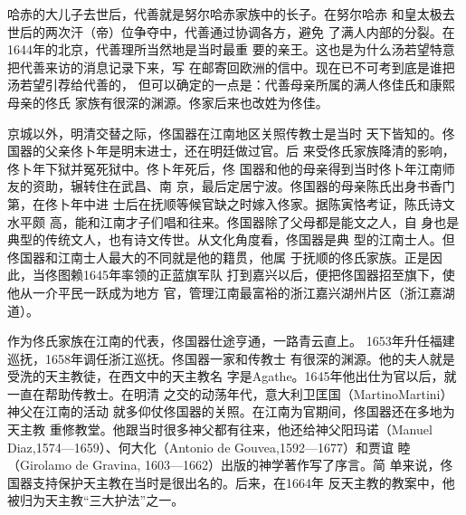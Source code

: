 哈赤的大儿子去世后，代善就是努尔哈赤家族中的长子。在努尔哈赤%
和皇太极去世后的两次汗（帝）位争夺中，代善通过协调各方，避免%
了满人内部的分裂。在1644年的北京，代善理所当然地是当时最重%
要的亲王。这也是为什么汤若望特意把代善来访的消息记录下来，写%
在邮寄回欧洲的信中。现在已不可考到底是谁把汤若望引荐给代善的，%
但可以确定的一点是：代善母亲所属的满人佟佳氏和康熙母亲的佟氏%
家族有很深的渊源。佟家后来也改姓为佟佳。%
\par
京城以外，明清交替之际，佟国器在江南地区关照传教士是当时%
天下皆知的。佟国器的父亲佟卜年是明末进士，还在明廷做过官。后%
来受佟氏家族降清的影响，佟卜年下狱并冤死狱中。佟卜年死后，佟%
国器和他的母亲得到当时佟卜年江南师友的资助，辗转住在武昌、南%
京，最后定居宁波。佟国器的母亲陈氏出身书香门第，在佟卜年中进%
士后在抚顺等候官缺之时嫁入佟家。据陈寅恪考证，陈氏诗文水平颇%
高，能和江南才子们唱和往来。佟国器除了父母都是能文之人，自%
身也是典型的传统文人，也有诗文传世。从文化角度看，佟国器是典%
型的江南士人。但佟国器和江南士人最大的不同就是他的籍贯，他属%
于抚顺的佟氏家族。正是因此，当佟图赖1645年率领的正蓝旗军队%
打到嘉兴以后，便把佟国器招至旗下，使他从一介平民一跃成为地方%
官，管理江南最富裕的浙江嘉兴湖州片区（浙江嘉湖道）。%
\par
作为佟氏家族在江南的代表，佟国器仕途亨通，一路青云直上。%
1653年升任福建巡抚，1658年调任浙江巡抚。佟国器一家和传教士%
有很深的渊源。他的夫人就是受洗的天主教徒，在西文中的天主教名%
字是Agathe。1645年他出仕为官以后，就一直在帮助传教士。在明清%
之交的动荡年代，意大利卫匡国（MartinoMartini）神父在江南的活动%
就多仰仗佟国器的关照。在江南为官期间，佟国器还在多地为天主教%
重修教堂。他跟当时很多神父都有往来，他还给神父阳玛诺（Manuel%
\space%
Diaz,1574—1659）、何大化（Antonio de Gouvea,1592—1677）和贾谊%
睦（Girolamo de Gravina, 1603—1662）出版的神学著作写了序言。简%
单来说，佟国器支持保护天主教在当时是很出名的。后来，在1664年%
反天主教的教案中，他被归为天主教“三大护法”之一。%

